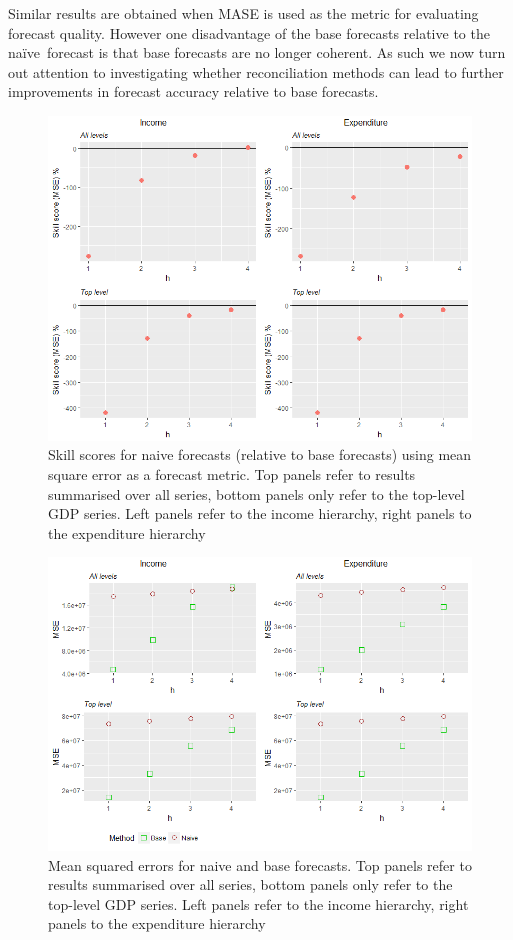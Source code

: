 \documentclass[graybox]{svmult}
\def\naive{na\"{i}ve\ }
\begin{document}
Similar results are obtained when MASE is used as the metric for evaluating forecast quality.  However one disadvantage of the base forecasts relative to the \naive forecast is that base forecasts are no longer coherent.  As such we now turn out attention to investigating whether reconciliation methods can lead to further improvements in forecast accuracy relative to base forecasts.

\begin{figure}[H]
	\centering
	\small
	\includegraphics[width=\textwidth]{Figs/Results/NaiveVsBase_SS_MSE.png}
	\caption{Skill scores for naive forecasts (relative to base forecasts) using mean square error as a forecast metric.  Top panels refer to results summarised over all series, bottom panels only refer to the top-level GDP series.  Left panels refer to the income hierarchy, right panels to the expenditure hierarchy}\label{fig: NaiveVsBase_SS_MSE}
\end{figure}

\begin{figure}[H]
	\centering
	\small
	\includegraphics[width=\textwidth]{Figs/Results/NaiveVsBase_MSE.png}
	\caption{Mean squared errors for naive and base forecasts. Top panels refer to results summarised over all series, bottom panels only refer to the top-level GDP series.  Left panels refer to the income hierarchy, right panels to the expenditure hierarchy}\label{fig: NaiveVsBase_MSE}
\end{figure}
\end{document}
